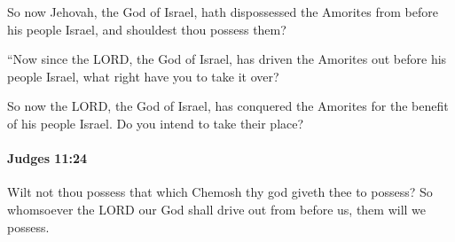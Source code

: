 			\begin{versebox}
					\item[BHS] 
					\item[ASV] So now Jehovah, the God of Israel, hath dispossessed the Amorites from before his people Israel, and shouldest thou possess them?
					\item[NIV] “Now since the LORD, the God of Israel, has driven the Amorites out before his people Israel, what right have you to take it over?
					\item[NRSV] So now the LORD, the God of Israel, has conquered the Amorites for the benefit of his people Israel. Do you intend to take their place?
			\end{versebox}

		\paragraph{Judges 11:24} %
			\label{JUDGES-11-24}

			Wilt not thou possess that which Chemosh thy god giveth thee to possess? So whomsoever the LORD our God shall drive out from before us, them will we possess.

